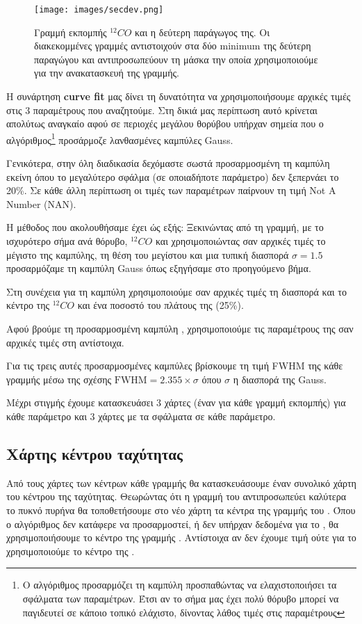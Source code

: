 \documentclass[a4paper,12pt]{memoir}
\begin{document}
\begin{figure}[H]
	\label{fig:secdev}
	\centering
	\texttt{[image: images/secdev.png]}
	\caption{Γραμμή εκπομπής $^{12}CO$ και η δεύτερη παράγωγος της. Οι διακεκομμένες γραμμές αντιστοιχούν στα δύο minimum της δεύτερη παραγώγου και αντιπροσωπεύουν τη μάσκα την οποία χρησιμοποιούμε για την ανακατασκευή της γραμμής.}
\end{figure}


Η συνάρτηση \textbf{curve fit} μας δίνει τη δυνατότητα να χρησιμοποιήσουμε αρχικές τιμές στις 3 παραμέτρους που αναζητούμε. Στη δικιά μας περίπτωση αυτό κρίνεται απολύτως αναγκαίο αφού σε περιοχές μεγάλου θορύβου υπήρχαν σημεία που ο αλγόριθμος\footnote{Ο αλγόριθμος προσαρμόζει τη καμπύλη προσπαθώντας να ελαχιστοποιήσει τα σφάλματα των παραμέτρων. Έτσι αν το σήμα μας έχει πολύ θόρυβο μπορεί να παγιδευτεί σε κάποιο τοπικό ελάχιστο, δίνοντας λάθος τιμές στις παραμέτρους} προσάρμοζε λανθασμένες καμπύλες Gauss. 

Γενικότερα, στην όλη διαδικασία δεχόμαστε σωστά προσαρμοσμένη τη καμπύλη εκείνη όπου το μεγαλύτερο σφάλμα (σε οποιαδήποτε παράμετρο) δεν ξεπερνάει το 20\%. Σε κάθε άλλη περίπτωση οι τιμές των παραμέτρων παίρνουν τη τιμή Not A Number (NAN).

Η μέθοδος που ακολουθήσαμε έχει ώς εξής: Ξεκινώντας από τη γραμμή, με το ισχυρότερο σήμα ανά θόρυβο, $^{12}CO$ και χρησιμοποιώντας σαν αρχικές τιμές το μέγιστο της καμπύλης, τη θέση του μεγίστου και μια τυπική διασπορά $\sigma =1.5$ προσαρμόζαμε τη καμπύλη Gauss όπως εξηγήσαμε στο προηγούμενο βήμα. 

Στη συνέχεια για τη καμπύλη  χρησιμοποιούμε σαν αρχικές τιμές τη διασπορά και το κέντρο της $^{12}CO$ και ένα ποσοστό του πλάτους της (25\%).

Αφού βρούμε τη προσαρμοσμένη καμπύλη , χρησιμοποιούμε τις παραμέτρους της σαν αρχικές τιμές στη  αντίστοιχα.

Για τις τρεις αυτές προσαρμοσμένες καμπύλες βρίσκουμε τη τιμή FWHM της κάθε γραμμής μέσω της σχέσης $\text{FWHM}=2.355 \times \sigma$ όπου $\sigma$ η διασπορά της Gauss.

Μέχρι στιγμής έχουμε κατασκευάσει 3 χάρτες (έναν για κάθε γραμμή εκπομπής) για κάθε παράμετρο και 3 χάρτες με τα σφάλματα σε κάθε παράμετρο.


\subsection{Χάρτης κέντρου ταχύτητας}
Από τους χάρτες των κέντρων κάθε γραμμής θα κατασκευάσουμε έναν συνολικό χάρτη του κέντρου της ταχύτητας. Θεωρώντας ότι η γραμμή του  αντιπροσωπεύει καλύτερα το πυκνό πυρήνα θα τοποθετήσουμε στο νέο χάρτη τα κέντρα της γραμμής του . Όπου ο αλγόριθμος δεν κατάφερε να προσαρμοστεί, ή δεν υπήρχαν δεδομένα για το , θα χρησιμοποιήσουμε το κέντρο της γραμμής . Αντίστοιχα αν δεν έχουμε τιμή ούτε για το  χρησιμοποιούμε το κέντρο της .
\end{document}
